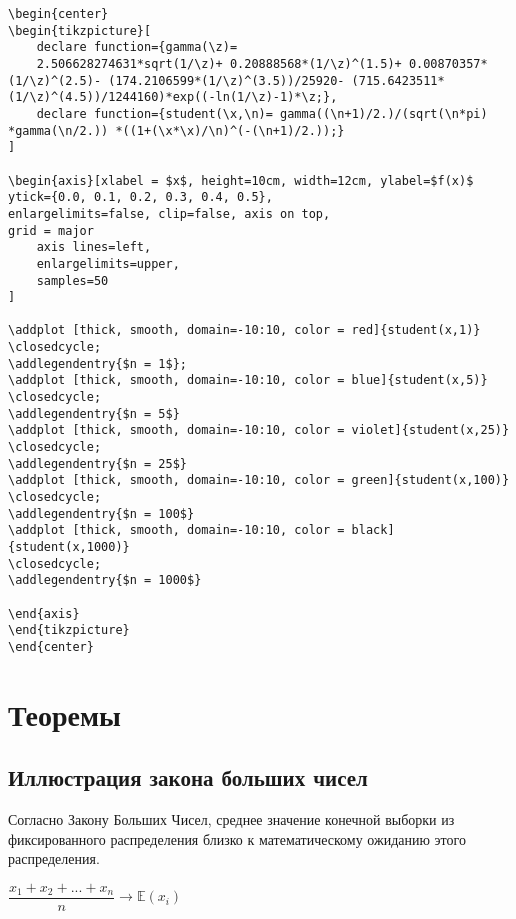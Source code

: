 \documentclass[12pt,a4paper]{article}
\begin{document}
\begin{lstlisting}
\begin{center}
\begin{tikzpicture}[
    declare function={gamma(\z)=
    2.506628274631*sqrt(1/\z)+ 0.20888568*(1/\z)^(1.5)+ 0.00870357*(1/\z)^(2.5)- (174.2106599*(1/\z)^(3.5))/25920- (715.6423511*(1/\z)^(4.5))/1244160)*exp((-ln(1/\z)-1)*\z;},
    declare function={student(\x,\n)= gamma((\n+1)/2.)/(sqrt(\n*pi) *gamma(\n/2.)) *((1+(\x*\x)/\n)^(-(\n+1)/2.));}
]

\begin{axis}[xlabel = $x$, height=10cm, width=12cm, ylabel=$f(x)$
ytick={0.0, 0.1, 0.2, 0.3, 0.4, 0.5},
enlargelimits=false, clip=false, axis on top,
grid = major
    axis lines=left,
    enlargelimits=upper,
    samples=50
]

\addplot [thick, smooth, domain=-10:10, color = red]{student(x,1)} \closedcycle;
\addlegendentry{$n = 1$};
\addplot [thick, smooth, domain=-10:10, color = blue]{student(x,5)} \closedcycle;
\addlegendentry{$n = 5$}
\addplot [thick, smooth, domain=-10:10, color = violet]{student(x,25)}
\closedcycle;
\addlegendentry{$n = 25$}
\addplot [thick, smooth, domain=-10:10, color = green]{student(x,100)}
\closedcycle;
\addlegendentry{$n = 100$}
\addplot [thick, smooth, domain=-10:10, color = black]{student(x,1000)}
\closedcycle;
\addlegendentry{$n = 1000$}

\end{axis}
\end{tikzpicture}
\end{center}
\end{lstlisting}

\clearpage

\section{Теоремы}

\subsection{Иллюстрация закона больших чисел}

Согласно Закону Больших Чисел, среднее значение конечной выборки из фиксированного распределения близко к математическому ожиданию этого распределения.

\begin{center}
	$ \dfrac{x_1 + x_2 + ... + x_n}{n} \to \mathbb{E}(x_i) $
\end{center}
\end{document}
